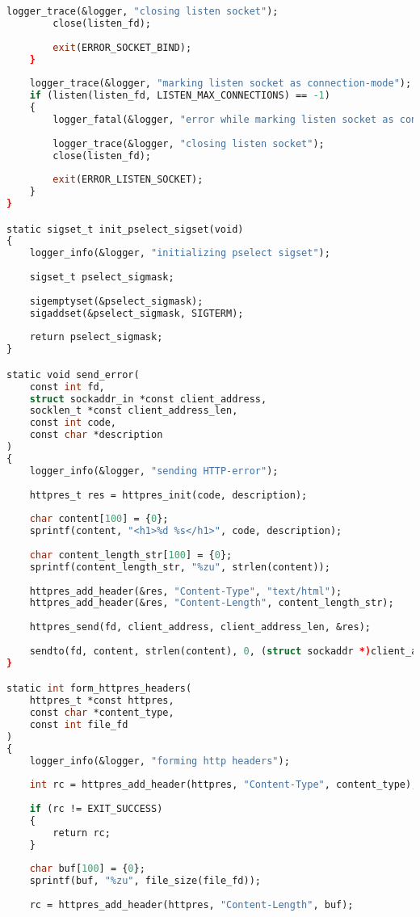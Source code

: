 \begin{lstlisting}[label=server_code,caption=Реализация статического веб-сервера,language=Caml]
		logger_trace(&logger, "closing listen socket");
		close(listen_fd);
		
		exit(ERROR_SOCKET_BIND);
	}
	
	logger_trace(&logger, "marking listen socket as connection-mode");
	if (listen(listen_fd, LISTEN_MAX_CONNECTIONS) == -1)
	{
		logger_fatal(&logger, "error while marking listen socket as connection-mode");
		
		logger_trace(&logger, "closing listen socket");
		close(listen_fd);
		
		exit(ERROR_LISTEN_SOCKET);
	}
}

static sigset_t init_pselect_sigset(void)
{
	logger_info(&logger, "initializing pselect sigset");
	
	sigset_t pselect_sigmask;
	
	sigemptyset(&pselect_sigmask);
	sigaddset(&pselect_sigmask, SIGTERM);
	
	return pselect_sigmask;
}

static void send_error(
	const int fd,
	struct sockaddr_in *const client_address,
	socklen_t *const client_address_len,
	const int code,
	const char *description
)
{
	logger_info(&logger, "sending HTTP-error");
	
	httpres_t res = httpres_init(code, description);
	
	char content[100] = {0};
	sprintf(content, "<h1>%d %s</h1>", code, description);
	
	char content_length_str[100] = {0};
	sprintf(content_length_str, "%zu", strlen(content));
	
	httpres_add_header(&res, "Content-Type", "text/html");
	httpres_add_header(&res, "Content-Length", content_length_str);
	
	httpres_send(fd, client_address, client_address_len, &res);
	
	sendto(fd, content, strlen(content), 0, (struct sockaddr *)client_address, *client_address_len);
}

static int form_httpres_headers(
	httpres_t *const httpres,
	const char *content_type,
	const int file_fd
)
{
	logger_info(&logger, "forming http headers");
	
	int rc = httpres_add_header(httpres, "Content-Type", content_type);
	
	if (rc != EXIT_SUCCESS)
	{
		return rc;
	}
	
	char buf[100] = {0};
	sprintf(buf, "%zu", file_size(file_fd));
	
	rc = httpres_add_header(httpres, "Content-Length", buf);
	

\end{lstlisting}
